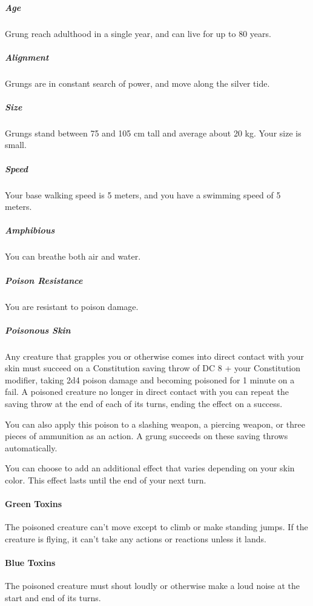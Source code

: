     \subparagraph{Age} Grung reach adulthood in a single year, and can live for up to 80 years.

    \subparagraph{Alignment} %
    Grungs are in constant search of power, and move along the silver tide.

    \subparagraph{Size} Grungs stand between 75 and 105 cm tall and average about 20 kg.
    Your size is small.

    \subparagraph{Speed} Your base walking speed is 5 meters, and you have a swimming speed of 5 meters.

    \subparagraph{Amphibious} You can breathe both air and water.

    \subparagraph{Poison Resistance} You are resistant to poison damage.

    \subparagraph{Poisonous Skin} Any creature that grapples you or otherwise comes into direct contact with your skin must succeed on a Constitution saving throw of DC 8 + your Constitution modifier, taking 2d4 poison damage and becoming poisoned for 1 minute on a fail.
    A poisoned creature no longer in direct contact with you can repeat the saving throw at the end of each of its turns, ending the effect on a success.

    You can also apply this poison to a slashing weapon, a piercing weapon, or three pieces of ammunition as an action.
    A grung succeeds on these saving throws automatically.

    You can choose to add an additional effect that varies depending on your skin color.
    This effect lasts until the end of your next turn.

        \paragraph{Green Toxins} The poisoned creature can't move except to climb or make standing jumps.
        If the creature is flying, it can't take any actions or reactions unless it lands.

        \paragraph{Blue Toxins} The poisoned creature must shout loudly or otherwise make a loud noise at the start and end of its turns.

